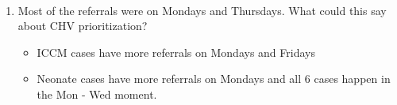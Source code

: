 \documentclass[11pt]{article}
\providecommand{\tightlist}{%
      \setlength{\itemsep}{0pt}\setlength{\parskip}{0pt}}
\begin{document}
    \begin{center}
    \end{center}
    { \hspace*{\fill} \\}
    
    \begin{enumerate}
\def\labelenumi{\arabic{enumi}.}
\setcounter{enumi}{1}
\tightlist
\item
  Most of the referrals were on Mondays and Thursdays. What could this
  say about CHV prioritization?

  \begin{itemize}
  \tightlist
  \item
    ICCM cases have more referrals on Mondays and Fridays
  \item
    Neonate cases have more referrals on Mondays and all 6 cases happen
    in the Mon - Wed moment.
  \end{itemize}
\end{enumerate}
\end{document}
